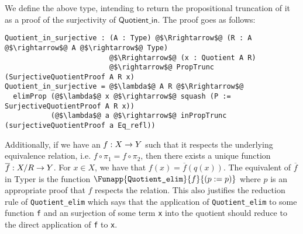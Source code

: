 \documentclass[12pt,twoside,maitrise]{dms}
\theoremstyle{definition}
\numberwithin{equation}{section}
\numberwithin{table}{chapter}
\numberwithin{figure}{chapter}
\newcommand\kw[1] {\textsf{#1}}
\newcommand\id[1] {\texttt{#1}}
\begin{document}
We define the above type, intending to return the propositional truncation of it as a proof of the surjectivity of $\kw{Quotient\_in}$. The proof goes as follows:

\begin{verbatim}
Quotient_in_surjective : (A : Type) @$\Rrightarrow$@ (R : A @$\rightarrow$@ A @$\rightarrow$@ Type)
                         @$\Rrightarrow$@ (x : Quotient A R)
                         @$\rightarrow$@ PropTrunc (SurjectiveQuotientProof A R x)
Quotient_in_surjective = @$\lambda$@ A R @$\Rrightarrow$@
  elimProp (@$\lambda$@ x @$\rightarrow$@ squash (P := SurjectiveQuotientProof A R x))
           (@$\lambda$@ a @$\rightarrow$@ inPropTrunc (surjectiveQuotientProof a Eq_refl))
\end{verbatim}

Additionally, if we have an $\oftype{f}{X \rightarrow Y}$ such that it respects
the underlying equivalence relation, i.e. $f \circ \pi_1 = f \circ \pi_2$, then
there exists a unique function $\oftype{\overline{f}}{X/R \rightarrow Y}$. For
$x \in X$, we have that $f(x) = \overline{f}(q(x))$. The equivalent of
$\overline{f}$ in Typer is the function
$\Funapp{\id{Quotient\_elim}}{f}{(\earg{p}{p})}$ where $p$ is an appropriate
proof that $f$ respects the relation. This also justifies the reduction rule of
\id{Quotient\_elim} which says that the application of \id{Quotient\_elim} to
some function \id{f} and an surjection of some term \id{x} into the quotient
should reduce to the direct application of \id{f} to \id{x}.
\end{document}
